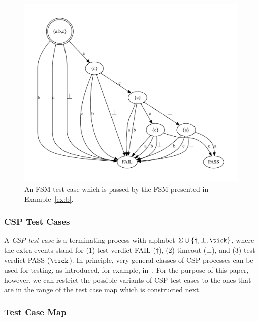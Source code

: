  \begin{figure}
 \begin{center}
\includegraphics[width=.8\textwidth]{fsm0tc.pdf}
\end{center}
\caption{An FSM test case which is passed by the FSM presented in Example~\ref{ex:b}.}
 \label{fig:fsm0tc}
 \end{figure}

 


\subsubsection*{CSP Test Cases}
A \emph{CSP test case} is a terminating process with alphabet 
$\Sigma\cup\{\dag,\bot,\tick \}$, where the extra events stand for 
(1) test  verdict FAIL ($\dag$), (2) timeout ($\bot$), and (3) test 
 verdict PASS ($\tick$). In principle, very general classes of CSP processes can be
 used for testing, as introduced, for example, 
 in~\cite{DBLP:conf/fm/PeleskaS96,peleska1997a}. For the purpose of this paper, however, we can restrict the possible variants of CSP test cases to the ones that are in the range of the test case map which is constructed next.



\subsubsection*{Test Case Map}


